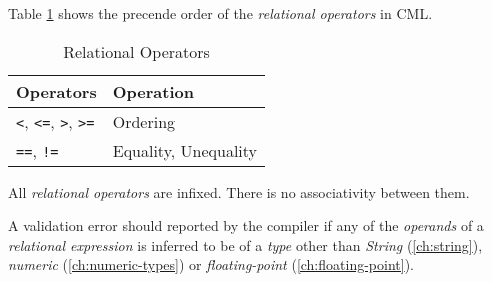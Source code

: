 Table \ref{tab:relational-expr-constraints} shows
the precende order of the \emph{relational operators} in CML.

\begin{table}[H]
\centering
\begin{tabular}
{ l l }
\hline
Operators & Operation \\
\hline
\verb!<!, \verb!<=!, \verb!>!, \verb!>=! & Ordering \\
\verb!==!, \verb|!=| & Equality, Unequality
\end{tabular}
\caption{Relational Operators}
\label{tab:relational-expr-constraints}
\end{table}

All \emph{relational operators} are infixed.
There is no associativity between them.

A validation error should reported by the compiler if any of the \emph{operands}
of a \emph{relational expression} is inferred to be of a \emph{type}
other than \emph{String} (\ref{ch:string}),
\emph{numeric} (\ref{ch:numeric-types})
or \emph{floating-point} (\ref{ch:floating-point}).

